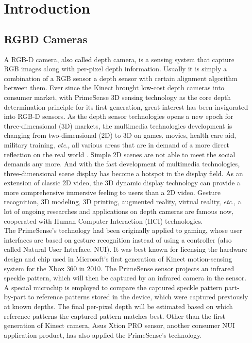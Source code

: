 \chapter{Introduction} %
\label{chapterIntroduction} 
\section{RGBD Cameras}
\indent
A RGB-D camera, also called depth camera, is a sensing system that capture RGB images along with per-pixel depth information. Usually it is simply a combination of a RGB sensor a depth sensor with certain alignment algorithm between them. Ever since the Kinect brought low-cost depth cameras into consumer market, with PrimeSense 3D sensing technology as the core depth determination principle for its first generation, great interest has been invigorated into RGB-D sensors. As the depth sensor technologies opens a new epoch for three-dimensional (3D) markets, the multimedia technologies development is changing from two-dimensional (2D) to 3D on games, movies, health care aid, military training, \textit{etc}., all various areas that are in demand of a more direct reflection on the real world \cite{depthOverview12}. Simple 2D scenes are not able to meet the social demands any more. And with the fast development of multimedia technologies, three-dimensional scene display has become a hotspot in the display field. As an extension of classic 2D video, the 3D dynamic display technology can provide a more comprehensive immersive feeling to users than a 2D video. Gesture recognition, 3D modeling, 3D printing, augmented reality, virtual reality, \textit{etc}., a lot of ongoing researches and applications on depth cameras are famous now, cooperated with Human Computer Interaction (HCI) technologies. %
\\\indent%
The PrimeSense's technology had been originally applied to gaming, whose user interfaces are based on gesture recognition instead of using a controller (also called Natural User Interface, NUI). It was best known for licensing the hardware design and chip used in Microsoft's first generation of Kinect motion-sensing system for the Xbox 360 in 2010. The PrimeSense sensor projects an infrared speckle pattern, which will then be captured by an infrared camera in the sensor. A special microchip is employed to compare the captured speckle pattern part-by-part to reference patterns stored in the device, which were captured previously at known depths. The final per-pixel depth will be estimated based on which reference patterns the captured pattern matches best. Other than the first generation of Kinect camera, Asus Xtion PRO sensor, another consumer NUI application product, has also applied the PrimeSense's technology.
